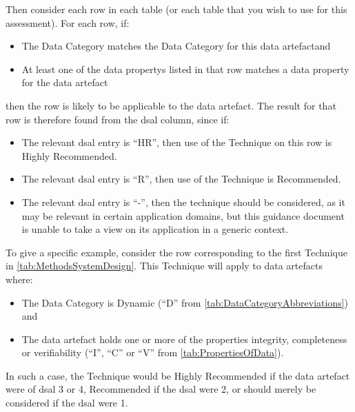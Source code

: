 Then consider each row in each table (or each table that you wish to use for this assessment). For each row, if:
\begin{itemize}
    \item The Data Category matches the Data Category for this \cbstart\gls{data artefact}\cbend and
    \item At least one of the \glspl{data property} listed in that row matches a \gls{data property} for the \cbstart\gls{data artefact}\cbend 
\end{itemize}
then the row is likely to be applicable to the \cbstart\gls{data artefact}\cbend. The result for that row is therefore found from the \gls{dsal} column, since if:
\begin{itemize}
    \item The relevant \gls{dsal} entry is ``HR'', then use of the Technique on this row is Highly Recommended.
    \item The relevant \gls{dsal} entry is ``R'', then use of the Technique is Recommended.
    \item The relevant \gls{dsal} entry is ``-'', then the technique should be considered, as it may be relevant in certain application domains, but this guidance document is unable to take a view on its application in a generic context.
\end{itemize}

To give a specific example, consider the row corresponding to the first Technique in \autoref{tab:MethodsSystemDesign}. This Technique will apply to \glspl{data artefact} where:
\begin{itemize}
    \item The Data Category is Dynamic (``D'' from \autoref{tab:DataCategoryAbbreviations}) and
    \item The \gls{data artefact} holds one or more of the properties \gls{integrity}, \gls{completeness} or \gls{verifiability} (``I'', ``C'' or ``V'' from \autoref{tab:PropertiesOfData}).
\end{itemize}
In such a case, the Technique would be Highly Recommended if the \gls{data artefact} were of \gls{dsal} 3 or 4, Recommended if the \gls{dsal} were 2, or should merely be considered if the \gls{dsal} were 1.

